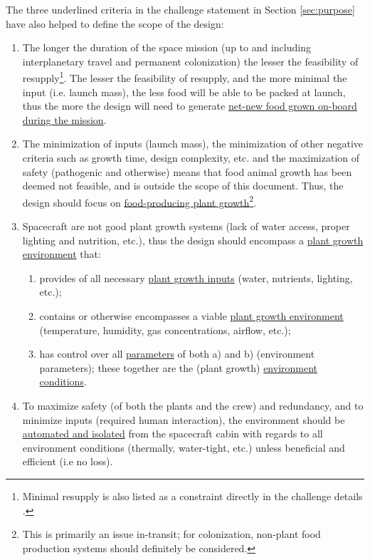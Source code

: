 \documentclass{report}
\begin{document}
The three underlined criteria in the challenge statement in Section \ref{sec:purpose} have also helped to define the scope of the design:
\begin{enumerate}[label=SC\arabic*., ref=SC\arabic*]
\item \label{sc:1} The longer the duration of the space mission (up to and including interplanetary travel and permanent colonization) the lesser the feasibility of
    resupply\footnote{Minimal resupply is also listed as a constraint directly in the challenge details \cite{applicantguide,dsfc-phase2}.}.
    The lesser the feasibility of resupply, and the more minimal the input (i.e. launch mass), the less food will be able to be packed at launch, thus the more the design will need to generate \uline{net-new food grown on-board during the mission}.
\item \label{sc:2} The minimization of inputs (launch mass), the minimization of other negative criteria such as growth time, design complexity, etc. and the maximization of safety (pathogenic and otherwise) means that food animal growth has been deemed not feasible, and is outside the scope of this document. Thus, the design should focus on \uline{food-producing plant
    growth}\footnote{This is primarily an issue in-transit; for colonization, non-plant food production systems should definitely be considered.}.
\item \label{sc:3} Spacecraft are not good plant growth systems (lack of water access, proper lighting and nutrition, etc.), thus the design should encompass a \uline{plant growth environment} that:
    \begin{enumerate}[label=SC3\alph*., ref=SC3\alph*]
        \item \label{sc:3a} provides of all necessary \uline{plant growth inputs} (water, nutrients, lighting, etc.);
        \item \label{sc:3b} contains or otherwise encompasses a viable \uline{plant growth environment} (temperature, humidity, gas concentrations, airflow, etc.);
        \item \label{sc:3c} has control over all \uline{parameters} of both a) and b) (environment parameters); these together are the (plant growth) \uline{environment conditions}.
    \end{enumerate}
\item \label{sc:4} To maximize safety (of both the plants and the crew) and redundancy, and to minimize inputs (required human interaction), the environment should be \uline{automated and isolated} from the spacecraft cabin with regards to all environment conditions (thermally, water-tight, etc.) unless beneficial and efficient (i.e no loss).

\end{enumerate}
\end{document}
